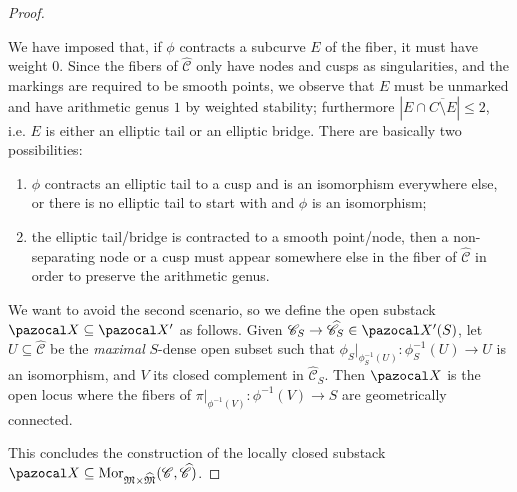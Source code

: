 \documentclass[11pt]{amsart}
\renewcommand{\to}{\rightarrow}
\newcommand{\X}{\pazocal X}
\newcommand{\cC}{\mathcal C}
\newcommand{\hC}{\widehat{\mathcal C}}
\newcommand{\MM}{\mathfrak M}
\newcommand{\hM}{\widehat{\mathfrak M}}
\theoremstyle{plain}
\theoremstyle{definition}
\begin{document}
\begin{proof}
\begin{description}[labelindent=0cm,leftmargin=\parindent]
\item[Step 4] We have imposed that, if $\phi$ contracts a subcurve $E$ of the fiber, it must have weight $0$. Since the fibers of $\hC$ only have nodes and cusps as singularities, and the markings are required to be smooth points, we observe that $E$ must be unmarked and have arithmetic genus $1$ by weighted stability; furthermore $\left|E\cap\overline{C\setminus E}\right|\leq 2$, i.e. $E$ is either an elliptic tail or an elliptic bridge. There are basically two possibilities:
\begin{enumerate}
\item $\phi$ contracts an elliptic tail to a cusp and is an isomorphism everywhere else, or there is no elliptic tail to start with and $\phi$ is an isomorphism;
\item the elliptic tail/bridge is contracted to a smooth point/node, then a non-separating node or a cusp must appear somewhere else in the fiber of $\hC$ in order to preserve the arithmetic genus.
\end{enumerate} 
We want to avoid the second scenario, so we define the open substack $\X\subseteq \X'$ as follows.
Given $\mathcal{C}_S\to\hC_S\in\X'(S)$, let $U\subseteq \hC$ be the \emph{maximal} $S$-dense open subset such that $\phi_S|_{\phi_S^{-1}(U)}\colon\phi_S^{-1}(U)\to U$ is an isomorphism, and $V$ its closed complement in $\hC_S$. 
Then $\X$ is the open locus \cite[\href{http://stacks.math.columbia.edu/tag/055G}{Tag 055G}]{stacks-project} where the fibers of $\pi|_{\phi^{-1}(V)}\colon \phi^{-1}(V)\to S$ are geometrically connected.
\end{description} 
This concludes the construction of the locally closed substack $\X\subseteq \operatorname{Mor}_{\MM\times\hM}(\cC,\hC)$.
 \end{proof}
 
\end{document}
